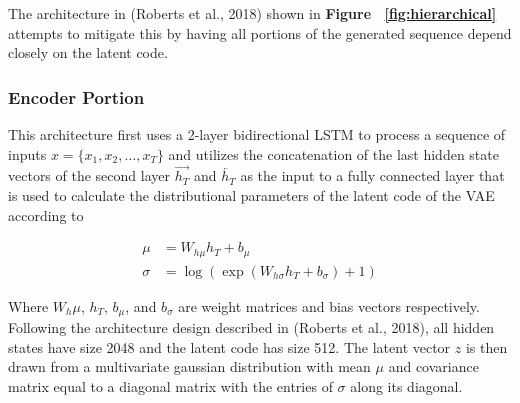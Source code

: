\documentclass[10pt,twocolumn]{article}
\begin{document}
The architecture in (Roberts et al., 2018) shown in \textbf{Figure ~\ref{fig:hierarchical}} attempts to mitigate this by having all portions of the generated sequence depend closely on the latent code.

\begin{figure}[H]
\end{figure}

\subsubsection{Encoder Portion}
This architecture first uses a 2-layer bidirectional LSTM to process a sequence of inputs $x = \{ x_1, x_2, \hdots, x_T \}$ and utilizes the concatenation of the last hidden state vectors of the second layer $\overrightarrow{h_T}$ and $\overleftarrow{h_T}$ as the input to a fully connected layer that is used to calculate the distributional parameters of the latent code of the VAE according to 

\begin{align*}
  \mu &= W_{h\mu} h_T + b_\mu \\
  \sigma &= \log(\exp(W_{h\sigma} h_T + b_\sigma) + 1)
\end{align*}

Where $W_h\mu$, $h_T$, $b_\mu$, and $b_\sigma$ are weight matrices and bias vectors respectively. Following the architecture design described in (Roberts et al., 2018), all hidden states have size 2048 and the latent code has size 512. The latent vector $z$ is then drawn from a multivariate gaussian distribution with mean $\mu$ and covariance matrix equal to a diagonal matrix with the entries of $\sigma$ along its diagonal.
\end{document}
